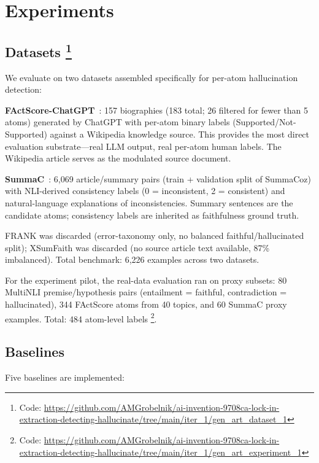 \documentclass[11pt,letterpaper]{article}
\begin{document}
\section{Experiments}
\label{sec:experiments}

\subsection{Datasets \footnote{Code: \url{https://github.com/AMGrobelnik/ai-invention-9708ca-lock-in-extraction-detecting-hallucinate/tree/main/iter_1/gen_art_dataset_1}}}

We evaluate on two datasets assembled specifically for per-atom hallucination detection:

\textbf{FActScore-ChatGPT}~\citep{Min2023}: 157 biographies (183 total; 26 filtered for fewer than 5 atoms) generated
by ChatGPT with per-atom binary labels (Supported/Not-Supported) against a Wikipedia knowledge source. This provides
the most direct evaluation substrate---real LLM output, real per-atom human labels. The Wikipedia article serves as
the modulated source document.

\textbf{SummaC}~\citep{Laban2021}: 6,069 article/summary pairs (train + validation split of SummaCoz) with
NLI-derived consistency labels (0 = inconsistent, 2 = consistent) and natural-language explanations of
inconsistencies. Summary sentences are the candidate atoms; consistency labels are inherited as faithfulness ground
truth.

FRANK was discarded (error-taxonomy only, no balanced faithful/hallucinated split); XSumFaith was discarded (no
source article text available, 87\% imbalanced). Total benchmark: 6,226 examples across two datasets.

For the experiment pilot, the real-data evaluation ran on proxy subsets: 80 MultiNLI premise/hypothesis pairs
(entailment = faithful, contradiction = hallucinated), 344 FActScore atoms from 40 topics, and 60 SummaC proxy
examples. Total: 484 atom-level labels \footnote{Code: \url{https://github.com/AMGrobelnik/ai-invention-9708ca-lock-in-extraction-detecting-hallucinate/tree/main/iter_1/gen_art_experiment_1}}.

\subsection{Baselines}

Five baselines are implemented:
\end{document}

